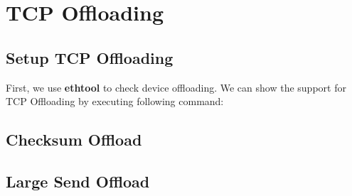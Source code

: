 \documentclass[bsc,frontabs,twoside,singlespacing,parskip,deptreport]{infthesis}     %
\begin{document}
\chapter{TCP Offloading}

\section{Setup TCP Offloading}
First, we use \textbf{ethtool} to check device offloading. We can show the support for TCP Offloading by executing following command: 






\section{Checksum Offload}


\section{Large Send Offload}








\end{document}
